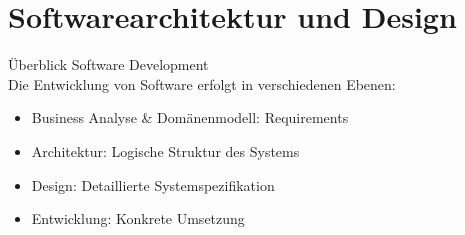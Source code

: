 \section{Softwarearchitektur und Design}

\begin{concept}{Überblick Software Development}\\
Die Entwicklung von Software erfolgt in verschiedenen Ebenen:
\begin{itemize}
    \item Business Analyse \& Domänenmodell: Requirements
    \item Architektur: Logische Struktur des Systems
    \item Design: Detaillierte Systemspezifikation
    \item Entwicklung: Konkrete Umsetzung
\end{itemize}


\end{concept}
